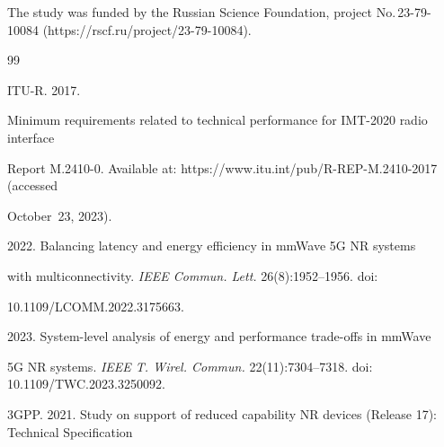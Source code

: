   \noindent


  The study was funded by the Russian Science Foundation, project No.\,23-79-10084 ({\sf https://rscf.ru/project/23-79-10084}). 










\renewcommand{\bibname}{\protect\rmfamily References}







{\small\frenchspacing


{ %




\begin{thebibliography}{99}




ITU-R.  2017.


  Minimum requirements related to technical performance for IMT-2020 radio interface 


Report M.2410-0. Available at: {\sf https://www.itu.int/pub/R-REP-M.2410-2017} (accessed 


October~23, 2023).




   2022. Balancing latency and energy efficiency in mmWave 5G NR systems 


with multiconnectivity. \textit{IEEE Commun. Lett.} 26(8):1952--1956. doi: 


10.1109\!/\!LCOMM.2022.3175663. 




   2023. System-level analysis of energy and performance trade-offs in mmWave 


5G NR systems. \textit{IEEE T. Wirel. Commun.}  22(11):7304--7318. doi: 10.1109\!/\!TWC.2023.3250092.




 3GPP. 2021. Study on support of reduced capability NR devices (Release 17): Technical Specification 



\end{thebibliography}}}
